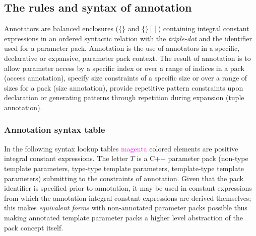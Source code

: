 
\subsection{The rules and syntax of annotation}

\p Annotators are balanced enclosures ($\bm{\{\}}$ and $\bm{\{\}[]}$) containing integral constant expressions in an ordered syntactic relation with the \textit{triple-dot} and the identifier used for a parameter pack.
Annotation is the use of annotators in a specific, declarative or expansive, parameter pack context.
The result of annotation is to allow parameter access by a specific index or over a range of indices in a pack (access annotation), specify size constraints of a specific size or over a range of sizes for a pack (size annotation), provide repetitive pattern constraints upon declaration or generating patterns through repetition during expansion (tuple annotation).

\subsubsection{Annotation syntax table}

\p In the following syntax lookup tables \textcolor{Magenta}{magenta} colored elements are positive integral constant expressions.
The letter $T$ is a C++ parameter pack (non-type template parameters, type-type template parameters, template-type template parameters) submitting to the constraints of annotation.
Given that the pack identifier is specified prior to annotation, it may be used in constant expressions from which the annotation integral constant expressions are derived themselves; this makes \textit{equivalent forms} with non-annotated parameter packs possible thus making annotated template parameter packs a higher level abstraction of the pack concept itself.

